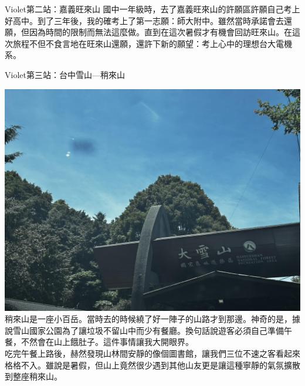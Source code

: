 \documentclass{article}
\begin{document}
\begin{large}
    \begin{boxpar}{Violet}{第二站：嘉義旺來山}
        國中一年級時，去了嘉義旺來山的許願區許願自己考上好高中。到了三年後，我的確考上了第一志願：師大附中。雖然當時承諾會去還願，但因為時間的限制而無法這麼做。直到在這次暑假才有機會回訪旺來山。在這次旅程不但不食言地在旺來山還願，還許下新的願望：考上心中的理想台大電機系。
    \end{boxpar}
\begin{boxpar}{Violet}{第三站：台中雪山—稍來山}
  \begin{tcolorbox}[sidebyside, lefthand width=0.25\textwidth, colback=Violet!50!white, colframe=Violet]
    \includegraphics[width=\linewidth]{mountsnow.jpg}
    \tcblower
    稍來山是一座小百岳。當時去的時候繞了好一陣子的山路才到那邊。神奇的是，據說雪山國家公園為了讓垃圾不留山中而少有餐廳。換句話說遊客必須自己準備午餐，不然會在山上餓肚子。這件事情讓我大開眼界。\\

    吃完午餐上路後，赫然發現山林間安靜的像個圖書館，讓我們三位不速之客看起來格格不入。雖說是暑假，但山上竟然很少遇到其他山友更是讓這種寧靜的氣氛擴散到整座稍來山。
  \end{tcolorbox}
\end{boxpar}

\end{large}
\end{document}
